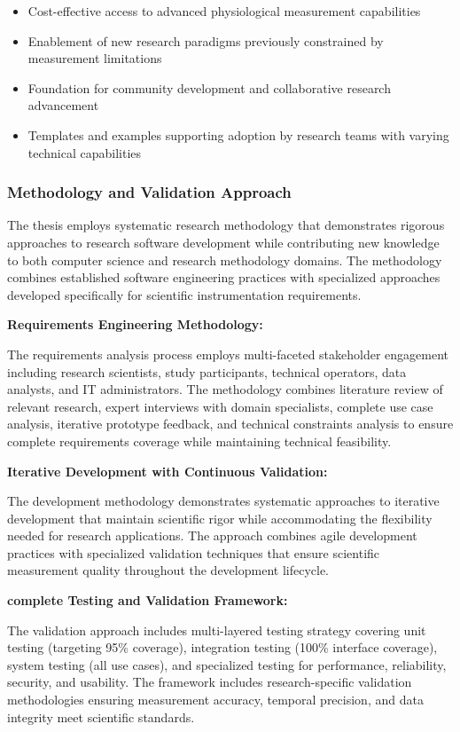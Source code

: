 \documentclass[11pt,a4paper]{article}
\begin{document}
\begin{itemize}
\item Cost-effective access to advanced physiological measurement capabilities
\item Enablement of new research paradigms previously constrained by measurement
limitations
\item Foundation for community development and collaborative research
advancement
\item Templates and examples supporting adoption by research teams with varying
technical capabilities

\end{itemize}
\subsubsection{Methodology and Validation Approach}

The thesis employs systematic research methodology that demonstrates rigorous
approaches to research software
development while contributing new knowledge to both computer science and
research methodology domains. The methodology
combines established software engineering practices with specialized approaches
developed specifically for scientific
instrumentation requirements.

\textbf{Requirements Engineering Methodology:}

The requirements analysis process employs multi-faceted stakeholder engagement
including research scientists, study
participants, technical operators, data analysts, and IT administrators. The
methodology combines literature review of
relevant research, expert interviews with domain specialists, complete use case
analysis, iterative prototype
feedback, and technical constraints analysis to ensure complete requirements
coverage while maintaining technical
feasibility.

\textbf{Iterative Development with Continuous Validation:}

The development methodology demonstrates systematic approaches to iterative
development that maintain scientific rigor
while accommodating the flexibility needed for research applications. The
approach combines agile development practices
with specialized validation techniques that ensure scientific measurement
quality throughout the development lifecycle.

\textbf{complete Testing and Validation Framework:}

The validation approach includes multi-layered testing strategy covering unit
testing (targeting 95\% coverage),
integration testing (100\% interface coverage), system testing (all use cases),
and specialized testing for performance,
reliability, security, and usability. The framework includes research-specific
validation methodologies ensuring
measurement accuracy, temporal precision, and data integrity meet scientific
standards.
\end{document}
